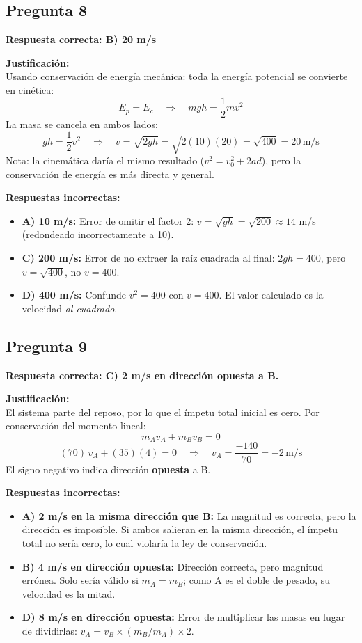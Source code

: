 \begin{respuestabox}
\subsection{Pregunta 8}
\textcolor{verdecorrecto}{\textbf{Respuesta correcta: B) 20 m/s}}

\textbf{Justificación:}\\
Usando conservación de energía mecánica: toda la energía potencial se convierte en cinética:
$$E_p = E_c \quad \Rightarrow \quad mgh = \frac{1}{2}mv^2$$
La masa se cancela en ambos lados:
$$gh = \frac{1}{2}v^2 \quad \Rightarrow \quad v = \sqrt{2gh} = \sqrt{2(10)(20)} = \sqrt{400} = 20\,\text{m/s}$$
Nota: la cinemática daría el mismo resultado ($v^2 = v_0^2 + 2ad$), pero la conservación de energía es más directa y general.

\textbf{Respuestas incorrectas:}
\begin{itemize}
    \item \textbf{A) 10 m/s:} Error de omitir el factor 2: $v = \sqrt{gh} = \sqrt{200} \approx 14$ m/s (redondeado incorrectamente a 10).
    \item \textbf{C) 200 m/s:} Error de no extraer la raíz cuadrada al final: $2gh = 400$, pero $v = \sqrt{400}$, no $v = 400$.
    \item \textbf{D) 400 m/s:} Confunde $v^2 = 400$ con $v = 400$. El valor calculado es la velocidad \textit{al cuadrado}.
\end{itemize}
\end{respuestabox}
\newpage
\begin{respuestabox}
\subsection{Pregunta 9}
\textcolor{verdecorrecto}{\textbf{Respuesta correcta: C) 2 m/s en dirección opuesta a B.}}

\textbf{Justificación:}\\
El sistema parte del reposo, por lo que el ímpetu total inicial es cero. Por conservación del momento lineal:
$$m_A v_A + m_B v_B = 0$$
$$(70)\,v_A + (35)(4) = 0 \quad \Rightarrow \quad v_A = \frac{-140}{70} = -2\,\text{m/s}$$
El signo negativo indica dirección \textbf{opuesta} a B.

\textbf{Respuestas incorrectas:}
\begin{itemize}
    \item \textbf{A) 2 m/s en la misma dirección que B:} La magnitud es correcta, pero la dirección es imposible. Si ambos salieran en la misma dirección, el ímpetu total no sería cero, lo cual violaría la ley de conservación.
    \item \textbf{B) 4 m/s en dirección opuesta:} Dirección correcta, pero magnitud errónea. Solo sería válido si $m_A = m_B$; como A es el doble de pesado, su velocidad es la mitad.
    \item \textbf{D) 8 m/s en dirección opuesta:} Error de multiplicar las masas en lugar de dividirlas: $v_A = v_B \times (m_B / m_A) \times 2$.
\end{itemize}
\end{respuestabox}


